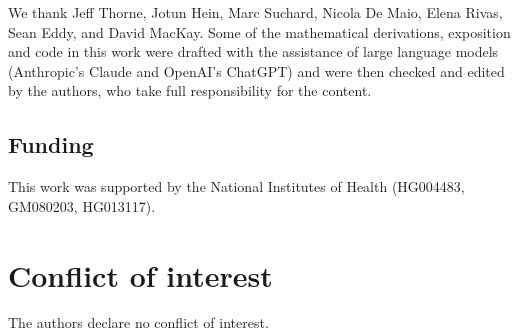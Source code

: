 \documentclass[11pt]{article}
\begin{document}
We thank Jeff Thorne, Jotun Hein, Marc Suchard, Nicola De Maio, Elena Rivas,
Sean Eddy, and David MacKay. Some of the mathematical derivations, exposition
and code in this work were drafted with the assistance of large language models
(Anthropic's Claude and OpenAI's ChatGPT) and were then checked and edited by the
authors, who take full responsibility for the content.

\subsection*{Funding}

This work was supported by the National Institutes of Health
(HG004483, GM080203, HG013117).

\section*{Conflict of interest}

The authors declare no conflict of interest.

\newpage


\end{document}
